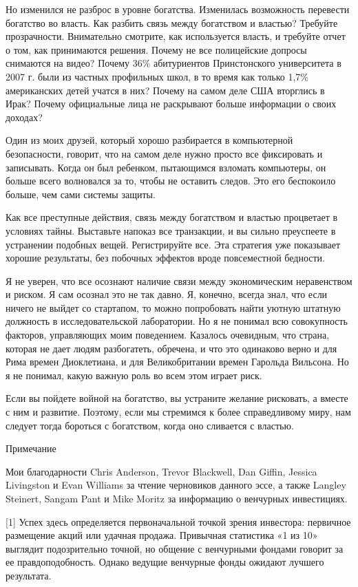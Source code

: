 \documentclass[ebook,12pt,oneside,openany]{memoir}
\begin{document}
Но изменился не разброс в уровне богатства. Изменилась возможность
перевести богатство во власть. Как разбить связь между богатством и
властью? Требуйте прозрачности. Внимательно смотрите, как используется
власть, и требуйте отчет о том, как принимаются решения. Почему не все
полицейские допросы снимаются на видео? Почему 36\% абитуриентов
Принстонского университета в 2007 г. были из частных профильных школ,
в то время как только 1,7\% американских детей учатся в них? Почему на
самом деле США вторглись в Ирак? Почему официальные лица не раскрывают
больше информации о своих доходах?

Один из моих друзей, который хорошо разбирается в компьютерной
безопасности, говорит, что на самом деле нужно просто все фиксировать
и записывать. Когда он был ребенком, пытающимся взломать компьютеры,
он больше всего волновался за то, чтобы не оставить следов. Это его
беспокоило больше, чем сами системы защиты.

Как все преступные действия, связь между богатством и властью
процветает в условиях тайны. Выставьте напоказ все транзакции, и вы
сильно преуспеете в устранении подобных вещей. Регистрируйте все. Эта
стратегия уже показывает хорошие результаты, без побочных эффектов
вроде повсеместной бедности.

Я не уверен, что все осознают наличие связи между экономическим
неравенством и риском. Я сам осознал это не так давно. Я, конечно,
всегда знал, что если ничего не выйдет со стартапом, то можно
попробовать найти уютную штатную должность в исследовательской
лаборатории. Но я не понимал всю совокупность факторов, управляющих
моим поведением. Казалось очевидным, что страна, которая не дает людям
разбогатеть, обречена, и что это одинаково верно и для Рима времен
Диоклетиана, и для Великобритании времен Гарольда Вильсона. Но я не
понимал, какую важную роль во всем этом играет риск.

Если вы пойдете войной на богатство, вы устраните желание рисковать, а
вместе с ним и развитие. Поэтому, если мы стремимся к более
справедливому миру, нам следует тогда бороться с богатством, когда оно
сливается с властью.

Примечание

Мои благодарности Chris Anderson, Trevor Blackwell, Dan Giffin,
Jessica Livingston и Evan Williams за чтение черновиков данного эссе,
а также Langley Steinert, Sangam Pant и Mike Moritz за информацию о
венчурных инвестициях.

[1] Успех здесь определяется первоначальной точкой зрения инвестора:
первичное размещение акций или удачная продажа. Привычная статистика
«1 из 10» выглядит подозрительно точной, но общение с венчурными
фондами говорит за ее правдоподобность. Однако ведущие венчурные фонды
ожидают лучшего результата.
\end{document}
